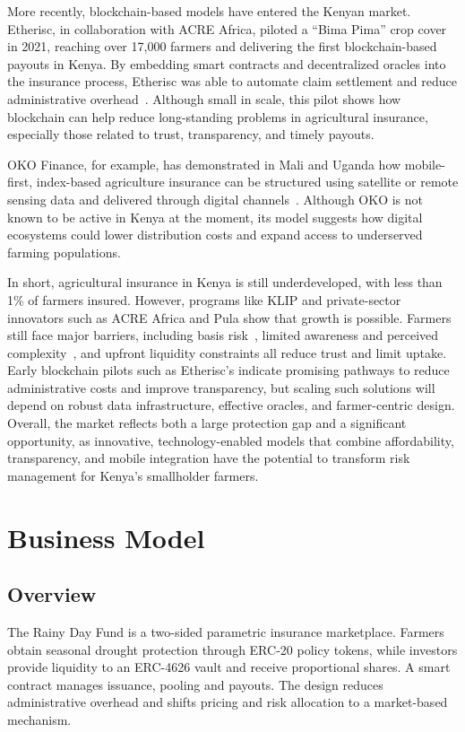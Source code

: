\documentclass[11pt,a4paper]{article}
\begin{document}
		More recently, blockchain-based models have entered the Kenyan market.
		Etherisc, in collaboration with ACRE Africa, piloted a \enquote{Bima Pima} crop cover in 2021, reaching over 17,000 farmers and delivering the first blockchain-based payouts in Kenya.
		By embedding smart contracts and decentralized oracles into the insurance process, Etherisc was able to automate claim settlement and reduce administrative overhead~\parencite{Etherisc2021}.
		Although small in scale, this pilot shows how blockchain can help reduce long-standing problems in agricultural insurance, especially those related to trust, transparency, and timely payouts.

		OKO Finance, for example, has demonstrated in Mali and Uganda how mobile-first, index-based agriculture insurance can be structured using satellite or remote sensing data and delivered through digital channels~\parencite{ADA_OKOFinance2021}.
		Although OKO is not known to be active in Kenya at the moment, its model suggests how digital ecosystems could lower distribution costs and expand access to underserved farming populations.

		In short, agricultural insurance in Kenya is still underdeveloped, with less than 1\% of farmers insured.
		However, programs like KLIP and private-sector innovators such as ACRE Africa and Pula show that growth is possible.
		Farmers still face major barriers, including basis risk~\parencite{Jensen2016}, limited awareness and perceived complexity~\parencite{Janzen2020}, and upfront liquidity constraints all reduce trust and limit uptake.
		Early blockchain pilots such as Etherisc's indicate promising pathways to reduce administrative costs and improve transparency, but scaling such solutions will depend on robust data infrastructure, effective oracles, and farmer-centric design.
		Overall, the market reflects both a large protection gap and a significant opportunity, as innovative, technology-enabled models that combine affordability, transparency, and mobile integration have the potential to transform risk management for Kenya's smallholder farmers.	

		\section{Business Model}\label{sec:business-model}

		\subsection{Overview}\label{subsec:overview}
		The Rainy Day Fund is a two-sided parametric insurance marketplace.
		Farmers obtain seasonal drought protection through ERC-20 policy tokens, while investors provide liquidity to an ERC-4626 vault and receive proportional shares.
		A smart contract manages issuance, pooling and payouts.
		The design reduces administrative overhead and shifts pricing and risk allocation to a market-based mechanism.
\end{document}
